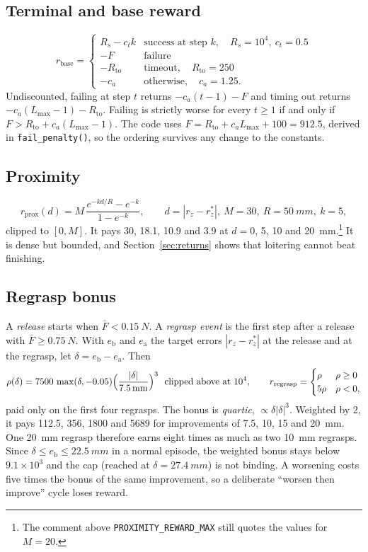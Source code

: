 \documentclass[10.5pt,a4paper]{article}
\newcommand{\code}[1]{\texttt{#1}}
\begin{document}
\subsection{Terminal and base reward}
\begin{equation}
r_{\text{base}}=\begin{cases}
R_s-c_tk & \text{success at step }k,\quad R_s=10^4,\ c_t=0.5\\
-F & \text{failure}\\
-R_{\text{to}} & \text{timeout},\quad R_{\text{to}}=250\\
-c_a & \text{otherwise},\quad c_a=1.25 .
\end{cases}
\end{equation}
Undiscounted, failing at step $t$ returns $-c_a(t-1)-F$ and timing out returns $-c_a(L_{\max}-1)-R_{\text{to}}$.
Failing is strictly worse for every $t\ge1$ if and only if $F>R_{\text{to}}+c_a(L_{\max}-1)$. The code uses
$F=R_{\text{to}}+c_aL_{\max}+100=912.5$, derived in \code{fail\_penalty()}, so the ordering survives any change
to the constants.

\subsection{Proximity}
\begin{equation}
r_{\text{prox}}(d)=M\,\frac{e^{-kd/R}-e^{-k}}{1-e^{-k}},\qquad d=|r_z-r_z^*|,\ M=30,\ R=\SI{50}{mm},\ k=5,
\end{equation}
clipped to $[0,M]$. It pays 30, 18.1, 10.9 and 3.9 at $d=0$, 5, 10 and \SI{20}{mm}.\footnote{The comment above
\code{PROXIMITY\_REWARD\_MAX} still quotes the values for $M=20$.} It is dense but bounded, and
Section~\ref{sec:returns} shows that loitering cannot beat finishing.

\subsection{Regrasp bonus}
A \emph{release} starts when $\bar F<\SI{0.15}{N}$. A \emph{regrasp event} is the first step after a release
with $\bar F\ge\SI{0.75}{N}$. With $e_{\text{b}}$ and $e_{\text{a}}$ the target errors $|r_z-r_z^*|$ at the
release and at the regrasp, let $\delta=e_{\text{b}}-e_{\text{a}}$. Then
\begin{equation}
\rho(\delta)=7500\,\max(\delta,-0.05)\Bigl(\frac{|\delta|}{\SI{7.5}{mm}}\Bigr)^{3}\ \ \text{clipped above at }10^4,
\qquad r_{\text{regrasp}}=\begin{cases}\rho & \rho\ge0\\ 5\rho&\rho<0,\end{cases}
\end{equation}
paid only on the first four regrasps. The bonus is \emph{quartic}, $\propto\delta|\delta|^3$. Weighted by 2, it
pays 112.5, 356, 1800 and 5689 for improvements of 7.5, 10, 15 and \SI{20}{mm}. One \SI{20}{mm} regrasp therefore
earns eight times as much as two \SI{10}{mm} regrasps. Since $\delta\le e_{\text{b}}\le\SI{22.5}{mm}$ in a normal
episode, the weighted bonus stays below $9.1\times10^3$ and the cap (reached at $\delta=\SI{27.4}{mm}$) is not
binding. A worsening costs five times the bonus of the same improvement, so a deliberate
``worsen then improve'' cycle loses reward.
\end{document}
